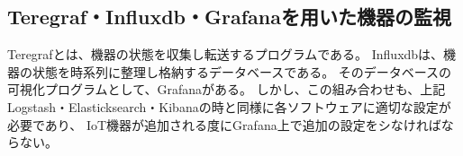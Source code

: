 \subsection{Teregraf・Influxdb・Grafanaを用いた機器の監視}
	Teregrafとは、機器の状態を収集し転送するプログラムである。
	Influxdbは、機器の状態を時系列に整理し格納するデータベースである。
	そのデータベースの可視化プログラムとして、Grafanaがある。
	しかし、この組み合わせも、上記Logstash・Elasticksearch・Kibanaの時と同様に各ソフトウェアに適切な設定が必要であり、
	IoT機器が追加される度にGrafana上で追加の設定をシなければならない。

